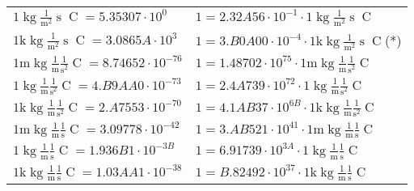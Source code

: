 \begin{center}
\begin{longtable}{l l}
{\color{black}$1 \bm{\mathrm{ }}\operatorname{kg}\frac1{\operatorname{m}^2}{\operatorname{s}}{\operatorname{C}}{} = 5.35307\cdot10^{0} $}   & {\color{black}$ 1 = 2.32A56\cdot10^{-1} \cdot 1 \bm{\mathrm{ }}\operatorname{kg}\frac1{\operatorname{m}^2}{\operatorname{s}}{\operatorname{C}}{}$}  \\
{\color{gray}$1 \bm{\mathrm{ k}}\operatorname{kg}\frac1{\operatorname{m}^2}{\operatorname{s}}{\operatorname{C}}{} = 3.0865A\cdot10^{3} $}   & {\color{gray}$ 1 = 3.B0A00\cdot10^{-4} \cdot 1 \bm{\mathrm{ k}}\operatorname{kg}\frac1{\operatorname{m}^2}{\operatorname{s}}{\operatorname{C}}{}$}\quad(*)\\
{\color{gray}$1 \bm{\mathrm{ m}}\operatorname{kg}\frac1{\operatorname{m}}\frac1{\operatorname{s}^2}{\operatorname{C}}{} = 8.74652\cdot10^{-76} $}   & {\color{gray}$ 1 = 1.48702\cdot10^{75} \cdot 1 \bm{\mathrm{ m}}\operatorname{kg}\frac1{\operatorname{m}}\frac1{\operatorname{s}^2}{\operatorname{C}}{}$}  \\
{\color{black}$1 \bm{\mathrm{ }}\operatorname{kg}\frac1{\operatorname{m}}\frac1{\operatorname{s}^2}{\operatorname{C}}{} = 4.B9AA0\cdot10^{-73} $}   & {\color{black}$ 1 = 2.4A739\cdot10^{72} \cdot 1 \bm{\mathrm{ }}\operatorname{kg}\frac1{\operatorname{m}}\frac1{\operatorname{s}^2}{\operatorname{C}}{}$}  \\
{\color{gray}$1 \bm{\mathrm{ k}}\operatorname{kg}\frac1{\operatorname{m}}\frac1{\operatorname{s}^2}{\operatorname{C}}{} = 2.A7553\cdot10^{-70} $}   & {\color{gray}$ 1 = 4.1AB37\cdot10^{6B} \cdot 1 \bm{\mathrm{ k}}\operatorname{kg}\frac1{\operatorname{m}}\frac1{\operatorname{s}^2}{\operatorname{C}}{}$}  \\
{\color{gray}$1 \bm{\mathrm{ m}}\operatorname{kg}\frac1{\operatorname{m}}\frac1{\operatorname{s}}{\operatorname{C}}{} = 3.09778\cdot10^{-42} $}   & {\color{gray}$ 1 = 3.AB521\cdot10^{41} \cdot 1 \bm{\mathrm{ m}}\operatorname{kg}\frac1{\operatorname{m}}\frac1{\operatorname{s}}{\operatorname{C}}{}$}  \\
{\color{black}$1 \bm{\mathrm{ }}\operatorname{kg}\frac1{\operatorname{m}}\frac1{\operatorname{s}}{\operatorname{C}}{} = 1.936B1\cdot10^{-3B} $}   & {\color{black}$ 1 = 6.91739\cdot10^{3A} \cdot 1 \bm{\mathrm{ }}\operatorname{kg}\frac1{\operatorname{m}}\frac1{\operatorname{s}}{\operatorname{C}}{}$}  \\
{\color{gray}$1 \bm{\mathrm{ k}}\operatorname{kg}\frac1{\operatorname{m}}\frac1{\operatorname{s}}{\operatorname{C}}{} = 1.03AA1\cdot10^{-38} $}   & {\color{gray}$ 1 = B.82492\cdot10^{37} \cdot 1 \bm{\mathrm{ k}}\operatorname{kg}\frac1{\operatorname{m}}\frac1{\operatorname{s}}{\operatorname{C}}{}$}  \\

\end{longtable}
\end{center}
